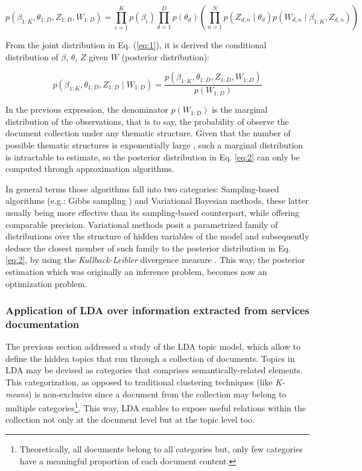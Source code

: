 \begin{equation}
p(\beta_{1:K},\theta_{1:D},Z_{1:D},W_{1:D})=\prod_{i=1}^{K}p(\beta_{i})\prod_{d=1}^{D}p(\theta_{d})(\prod_{n=1}^{N}p(Z_{d,n}\mid\theta_{d})p(W_{d,n}\mid\beta_{1:K},Z_{d,n}))\label{eq:1}
\end{equation}

From the joint distribution in Eq. (\ref{eq:1}), it is derived the conditional distribution of $\beta$, $\theta$, $Z$ given $W$ (posterior distribution):

\begin{equation}
p(\beta_{1:K},\theta_{1:D},Z_{1:D}\mid W_{1:D})=\frac{p(\beta_{1:K},\theta_{1:D},Z_{1:D},W_{1:D})}{p(W_{1:D})}\label{eq:2}
\end{equation}

In the previous expression, the denominator $p(W_{1:D})$ is the marginal distribution of the observations, that is to say, the probability of observe the document collection under any thematic structure. Given that the number of possible thematic structures is exponentially large \cite{Blei:2003}, such a marginal distribution is intractable to estimate, so the posterior distribution in Eq. \ref{eq:2} can only be computed through approximation algorithms.

In general terms those algorithms fall into two categories: Sampling-based algorithms (e.g.: Gibbs sampling \cite{Geman:1984}) and Variational Bayesian methods, these latter usually being more effective than its sampling-based counterpart, while offering comparable precision. Variational methods posit a parametrized family of distributions over the structure of hidden variables of the model and subsequently deduce the closest member of such family to the posterior distribution in Eq. \ref{eq:2}, by using the \emph{Kullback-Leibler} divergence measure \cite{Shlens:2007}.
This way, the posterior estimation which was originally an inference problem, becomes now an optimization problem. 


\subsubsection{Application of LDA over information extracted from services documentation}
\label{subsub:Application-of-LDA}

The previous section addressed a study of the LDA topic model, which allow to define the hidden topics that run through a collection of documents. Topics in LDA may be devised as categories  that comprises semantically-related elements. This categorization, as opposed to traditional clustering techniques (like \emph{K-means}) is non-exclusive since a document from the collection may belong to multiple categories\footnote{Theoretically, all documents belong to all categories but, only few categories have a meaningful proportion of each document content.}. This way, LDA enables to expose useful relations within the collection not only at the document level but at the topic level too. 

